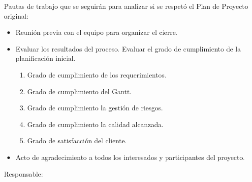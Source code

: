 \documentclass[11pt]{charter}
\begin{document}

Pautas de trabajo que se seguirán para analizar si se respetó el Plan de Proyecto original:

\begin{itemize}

\item Reunión previa con el equipo para organizar el cierre.

\item Evaluar los resultados del proceso. Evaluar el grado de cumplimiento de la planificación inicial.
\begin{enumerate}
\item Grado de cumplimiento de los requerimientos.
\item Grado de cumplimiento del Gantt.
\item Grado de cumplimiento la gestión de riesgos.
\item Grado de cumplimiento la calidad alcanzada.
\item Grado de satisfacción del cliente.
\end{enumerate}

\item Acto de agradecimiento a todos los interesados y participantes del proyecto.

\end{itemize}


Responsable: \authorname
\end{document}
